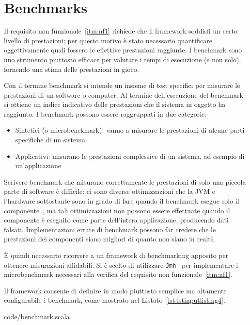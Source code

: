 \section{Benchmarks}\label{sec:benchmarks}
Il requisito non funzionale~\ref{itm:nf1} richiede che il framework soddisfi un certo livello di prestazioni;
per questo motivo è stato necessario quantificare oggettivamente quali fossero le effettive prestazioni raggiunte.
I benchmark sono uno strumento piuttosto efficace per valutare i tempi di esecuzione (e non solo), fornendo
una stima delle prestazioni in gioco.

Con il termine benchmark si intende un insieme di test specifici per misurare le prestazioni di un software o computer.
Al termine dell'esecuzione del benchmark si ottiene un indice indicativo delle prestazioni che il sistema in oggetto ha
raggiunto.
I benchmark possono essere raggruppati in due categorie:
\begin{itemize}
    \item Sintetici (o microbenckmark): vanno a misurare le prestazioni di alcune parti specifiche di un sistema
    \item Applicativi: misurano le prestazioni complessive di un sistema, ad esempio di un'applicazione
\end{itemize}

Scrivere benchmark che misurano correttamente le prestazioni di solo una piccola parte di software è difficile: ci sono
diverse ottimizzazioni che la JVM e l'hardware sottostante sono in grado di fare quando il benchmark
esegue solo il componente~\cite{jmh:details}, ma tali ottimizzazioni non possono essere effettuate quando il componente
è eseguito come parte dell'intera applicazione, producendo dati falsati.
Implementazioni errate di benchmark possono far credere che le prestazioni dei componenti siano migliori di quanto non
siano in realtà.

È quindi necessario ricorrere a un framework di benchmarking apposito per ottenere misurazioni affidabili.
Si è scelto di utilizzare \texttt{Jmh}~\cite{jmh} per implementare i microbenchmark necessari alla verifica del
requisito non funzionale~\ref{itm:nf1}.

Il framework consente di definire in modo piuttosto semplice ma altamente configurabile i benchmark, come mostrato nel
Listato~\ref{lst:lstinputlisting4}.


{code/benchmark.scala}

